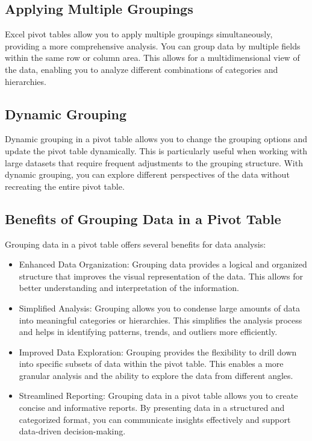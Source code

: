\documentclass[
]{book}
\begin{document}
\hypertarget{applying-multiple-groupings}{%
\subsection{Applying Multiple Groupings}\label{applying-multiple-groupings}}

Excel pivot tables allow you to apply multiple groupings simultaneously, providing a more comprehensive analysis. You can group data by multiple fields within the same row or column area. This allows for a multidimensional view of the data, enabling you to analyze different combinations of categories and hierarchies.

\hypertarget{dynamic-grouping}{%
\subsection{Dynamic Grouping}\label{dynamic-grouping}}

Dynamic grouping in a pivot table allows you to change the grouping options and update the pivot table dynamically. This is particularly useful when working with large datasets that require frequent adjustments to the grouping structure. With dynamic grouping, you can explore different perspectives of the data without recreating the entire pivot table.

\hypertarget{benefits-of-grouping-data-in-a-pivot-table}{%
\subsection{Benefits of Grouping Data in a Pivot Table}\label{benefits-of-grouping-data-in-a-pivot-table}}

Grouping data in a pivot table offers several benefits for data analysis:

\begin{itemize}
\item
  Enhanced Data Organization: Grouping data provides a logical and organized structure that improves the visual representation of the data. This allows for better understanding and interpretation of the information.
\item
  Simplified Analysis: Grouping allows you to condense large amounts of data into meaningful categories or hierarchies. This simplifies the analysis process and helps in identifying patterns, trends, and outliers more efficiently.
\item
  Improved Data Exploration: Grouping provides the flexibility to drill down into specific subsets of data within the pivot table. This enables a more granular analysis and the ability to explore the data from different angles.
\item
  Streamlined Reporting: Grouping data in a pivot table allows you to create concise and informative reports. By presenting data in a structured and categorized format, you can communicate insights effectively and support data-driven decision-making.
\end{itemize}
\end{document}
